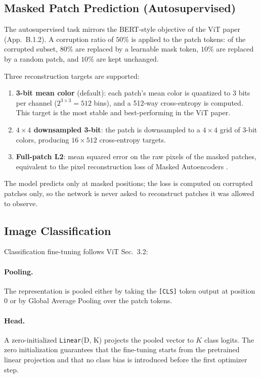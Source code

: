 \subsection{Masked Patch Prediction (Autosupervised)}

The autosupervised task mirrors the BERT-style objective of the ViT paper (App.~B.1.2). A corruption ratio of $50\%$ is applied to the patch tokens: of the corrupted subset, $80\%$ are replaced by a learnable mask token, $10\%$ are replaced by a random patch, and $10\%$ are kept unchanged.

Three reconstruction targets are supported:

\begin{enumerate}[leftmargin=*]
    \item \textbf{3-bit mean color} (default): each patch's mean color is quantized to 3 bits per channel ($2^{3\times3} = 512$ bins), and a 512-way cross-entropy is computed. This target is the most stable and best-performing in the ViT paper.
    \item \textbf{$4\times4$ downsampled 3-bit}: the patch is downsampled to a $4\times4$ grid of 3-bit colors, producing $16 \times 512$ cross-entropy targets.
    \item \textbf{Full-patch L2}: mean squared error on the raw pixels of the masked patches, equivalent to the pixel reconstruction loss of Masked Autoencoders \citep{he2022mae}.
\end{enumerate}

The model predicts only at masked positions; the loss is computed on corrupted patches only, so the network is never asked to reconstruct patches it was allowed to observe.

\subsection{Image Classification}

Classification fine-tuning follows ViT Sec.~3.2:

\paragraph{Pooling.}
The representation is pooled either by taking the \texttt{[CLS]} token output at position~$0$ or by Global Average Pooling over the patch tokens.

\paragraph{Head.}
A zero-initialized \texttt{Linear}(D, K) projects the pooled vector to $K$ class logits. The zero initialization guarantees that the fine-tuning starts from the pretrained linear projection and that no class bias is introduced before the first optimizer step.

